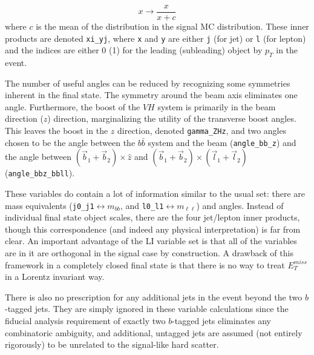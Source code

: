 \begin{equation}
\label{eqn:liip}
x\to\frac{x}{x+c}
\end{equation}
where $c$ is the mean of the distribution in the signal MC distribution.  These inner products are denoted \texttt{xi\_yj}, where \texttt{x} and \texttt{y} are either \texttt{j} (for jet) or \texttt{l} (for lepton) and the indices are either 0 (1) for the leading (subleading) object by $p_T$ in the event.

  The number of useful angles can be reduced by recognizing some symmetries inherent in the final state.  The symmetry around the beam axis eliminates one angle.  Furthermore, the boost of the $VH$ system is primarily in the beam direction ($z$) direction, marginalizing the utility of the transverse boost angles.  This leaves the boost in the $z$ direction, denoted \texttt{gamma\_ZHz}, and two angles chosen to be the angle between the $b\bar{b}$ system and the beam (\texttt{angle\_bb\_z}) and the angle between $\left(\vec{b}_1+\vec{b}_2\right)\times\hat{z}$ and $\left(\vec{b}_1+\vec{b}_2\right)\times\left(\vec{l}_1+\vec{l}_2\right)$ (\texttt{angle\_bbz\_bbll}).

These variables do contain a lot of information similar to the usual set: there are mass equivalents (\texttt{j0\_j1}$\leftrightarrow m_{bb}$, and \texttt{l0\_l1}$\leftrightarrow m_{\ell\ell}$) and angles.  Instead of individual final state object scales, there are the four jet/lepton inner products, though this correspondence (and indeed any physical interpretation) is far from clear.  An important advantage of the LI variable set is that all of the variables are in it are orthogonal in the signal case by construction.  A drawback of this framework in a completely closed final state is that there is no way to treat $E_T^{miss}$ in a Lorentz invariant way.  %

  There is also no prescription for any additional jets in the event beyond the two $b$-tagged jets.  They are simply ignored in these variable calculations since the fiducial analysis requirement of exactly two $b$-tagged jets eliminates any combinatoric ambiguity, and additional, untagged jets are assumed (not entirely rigorously) to be unrelated to the signal-like hard scatter.

